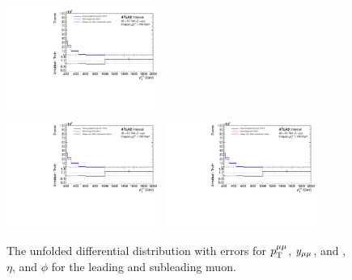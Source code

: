 \begin{figure}[h!]
  \includegraphics[page=123,width=0.45\textwidth]{figures/IBUPlots.pdf} \\
  \includegraphics[page=135,width=0.45\textwidth]{figures/IBUPlots.pdf}
  \includegraphics[page=147,width=0.45\textwidth]{figures/IBUPlots.pdf}
  \caption{The unfolded differential distribution with errors for $p_\mathrm{T}^{\mu\mu}$, $y_{\mu\mu}$, and \pt, $\eta$, and $\phi$ for the leading and subleading muon.}
  \label{fig:unfoldErr1}
\end{figure}


